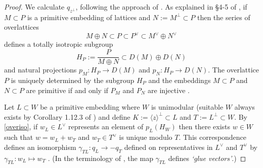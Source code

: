 \documentclass[12pt, a4paper]{article}
\newcommand{\la}{\langle}
\newcommand{\ra}{\rangle}
\newcommand{\op}{\oplus}
\begin{document}
\begin{proof}
  We calculate $q_{z^{\perp}}$, following the approach of \cite[Proposition 1.15.1]{Nikulin}.
  As explained in \S4-5 of \cite{Nikulin}, if $M \subset P$ is a primitive embedding of lattices and $N:=M^{\perp} \subset P$ then the series of overlattices
  \begin{equation*}
  M \op N \subset P \subset P^{\vee} \subset M^{\vee} \op N^{\vee} 
  \end{equation*}
  defines a totally isotropic subgroup
  \begin{equation}\label{overiso}
    H_P:=\frac{P}{M \op N} \subset D(M) \op D(N)
  \end{equation}
  and natural projections $p_M:H_P \rightarrow D(M)$ and $p_N:H_P \rightarrow D(N)$.
  The overlattice $P$ is uniquely determined by the subgroup $H_P$ and the embeddings $M \subset P$ and $N \subset P$ are primitive if and only if $P_M$ and $P_N$ are injective \cite[p.111]{Nikulin}.

  Let $L \subset W$ be a primitive embedding where $W$ is unimodular (suitable $W$ always exists by Corollary 1.12.3 of \cite{Nikulin}) and define $K:=\la z \ra^{\perp} \subset L$ and $T := L^{\perp} \subset W$.
  By \eqref{overiso}, if $w_L \in L^{\vee}$ represents an element of $p_L(H_W)$ then there exists $w \in W$ such that $w = w_L + w_T$ and $w_T \in T^{\vee}$ is unique modulo $T$.
  This correspondence defines an isomorphism
  $\gamma_{TL}:q_L \rightarrow -q_T$
  defined on representatives in $L^{\vee}$ and $T^{\vee}$ by
  $\gamma_{TL}:w_L \mapsto w_T$ \cite[\S5]{Nikulin}.
  (In the terminology of \cite{SPLAG}, the map $\gamma_{TL}$ defines \emph{`glue vectors'}.)
  

\end{proof}
\end{document}
